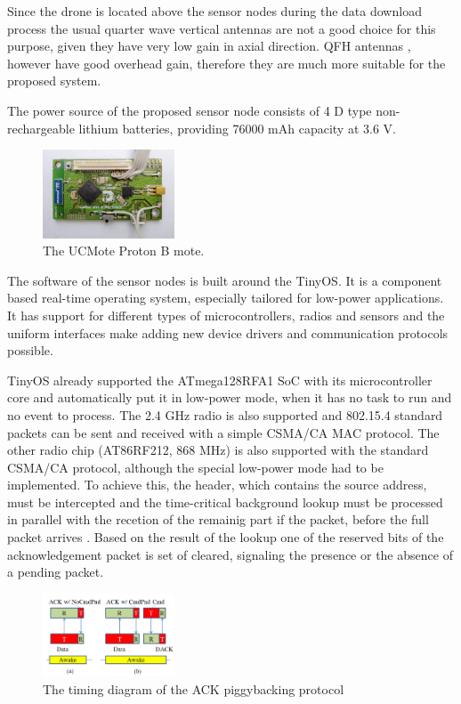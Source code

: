 \documentclass[conference]{IEEEtran}
\begin{document}
Since the drone is located above the sensor nodes during the data download
process the usual quarter wave vertical antennas are not a good choice for
this purpose, given they have very low gain in axial direction. QFH antennas \cite{adams1974},
however have good overhead gain, therefore they are much more suitable for the
proposed system.

The power source of the proposed sensor node consists of 4 D type non-rechargeable
lithium batteries, providing 76000 mAh capacity at 3.6 V.

\begin{figure}[htbp]
	\centering
	\includegraphics[width=0.35\textwidth]{fig/ucproton.png}
  \caption{The UCMote Proton B mote.}
	\label{fig-proton}
\end{figure}

The software of the sensor nodes is built around the TinyOS. It is a component
based real-time operating system, especially tailored for low-power
applications. It has support for different types of microcontrollers, radios
and sensors and the uniform interfaces make adding new device drivers and
communication protocols possible.

TinyOS already supported the ATmega128RFA1 SoC with its microcontroller core
and automatically put it in low-power mode, when it has no task to run and no
event to process. The 2.4 GHz radio is also supported and 802.15.4 standard
packets can be sent and received with a simple CSMA/CA MAC protocol. The other
radio chip (AT86RF212, 868 MHz) is also supported with the standard CSMA/CA
protocol, although the special low-power mode had to be implemented. To achieve this,
the header, which contains the source address, must be intercepted and the
time-critical background lookup must be processed in parallel with the recetion
of the remainig part if the packet, before the full packet arrives \cite{vakulya2013}.
Based on
the result of the lookup one of the reserved bits of the acknowledgement packet
is set of cleared, signaling the presence or the absence of a pending packet.

\begin{figure}[htbp]
	\centering
	\includegraphics[width=0.35\textwidth]{fig/protocol.png}
  \caption{The timing diagram of the ACK piggybacking protocol}
	\label{fig-piggyback}
\end{figure}
\end{document}
